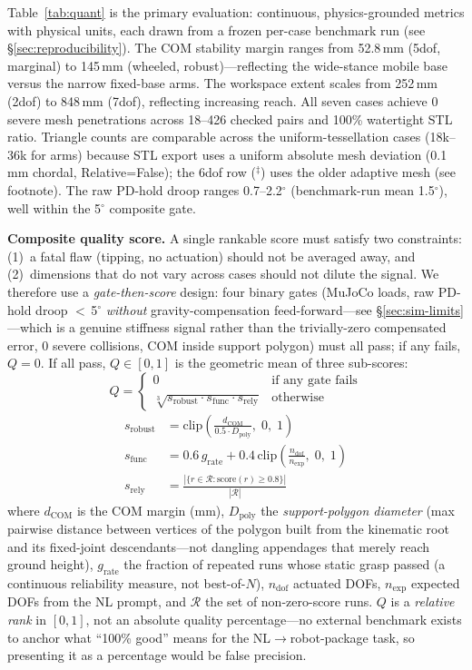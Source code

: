 \documentclass[conference]{IEEEtran}
\begin{document}
Table~\ref{tab:quant} is the primary evaluation: continuous, physics-grounded metrics with physical units, each drawn from a frozen per-case benchmark run (see \S\ref{sec:reproducibility}). The COM stability margin ranges from 52.8\,mm (5dof, marginal) to 145\,mm (wheeled, robust)---reflecting the wide-stance mobile base versus the narrow fixed-base arms. The workspace extent scales from 252\,mm (2dof) to 848\,mm (7dof), reflecting increasing reach. All seven cases achieve 0 severe mesh penetrations across 18--426 checked pairs and 100\% watertight STL ratio. Triangle counts are comparable across the uniform-tessellation cases (18k--36k for arms) because STL export uses a uniform absolute mesh deviation (0.1\,mm chordal, Relative=False); the 6dof row ($^\ddagger$) uses the older adaptive mesh (see footnote). The raw PD-hold droop ranges 0.7--2.2$^\circ$ (benchmark-run mean 1.5$^\circ$), well within the 5$^\circ$ composite gate.

\textbf{Composite quality score.} A single rankable score must satisfy two constraints: (1)~a fatal flaw (tipping, no actuation) should not be averaged away, and (2)~dimensions that do not vary across cases should not dilute the signal. We therefore use a \emph{gate-then-score} design: four binary gates (MuJoCo loads, raw PD-hold droop $<$\,5$^\circ$ \emph{without} gravity-compensation feed-forward---see \S\ref{sec:sim-limits}---which is a genuine stiffness signal rather than the trivially-zero compensated error, 0 severe collisions, COM inside support polygon) must all pass; if any fails, $Q=0$. If all pass, $Q \in [0,1]$ is the geometric mean of three sub-scores:
\begin{equation}
Q = \begin{cases} 0 & \text{if any gate fails} \\ \sqrt[3]{s_{\text{robust}} \cdot s_{\text{func}} \cdot s_{\text{rely}}} & \text{otherwise} \end{cases}
\label{eq:composite}
\end{equation}
\begin{align}
s_{\text{robust}} &= \mathrm{clip}\!\left(\frac{d_{\text{COM}}}{0.5 \cdot D_{\text{poly}}},\; 0,\; 1\right) \\
s_{\text{func}} &= 0.6\,g_{\text{rate}} + 0.4\,\mathrm{clip}\!\left(\frac{n_{\text{dof}}}{n_{\text{exp}}},\; 0,\; 1\right) \\
s_{\text{rely}} &= \frac{|\{r \in \mathcal{R} : \mathrm{score}(r) \geq 0.8\}|}{|\mathcal{R}|}
\end{align}
where $d_{\text{COM}}$ is the COM margin (mm), $D_{\text{poly}}$ the \emph{support-polygon diameter} (max pairwise distance between vertices of the polygon built from the kinematic root and its fixed-joint descendants---not dangling appendages that merely reach ground height), $g_{\text{rate}}$ the fraction of repeated runs whose static grasp passed (a continuous reliability measure, not best-of-$N$), $n_{\text{dof}}$ actuated DOFs, $n_{\text{exp}}$ expected DOFs from the NL prompt, and $\mathcal{R}$ the set of non-zero-score runs. $Q$ is a \emph{relative rank} in $[0,1]$, not an absolute quality percentage---no external benchmark exists to anchor what ``100\% good'' means for the NL$\to$robot-package task, so presenting it as a percentage would be false precision.
\end{document}

